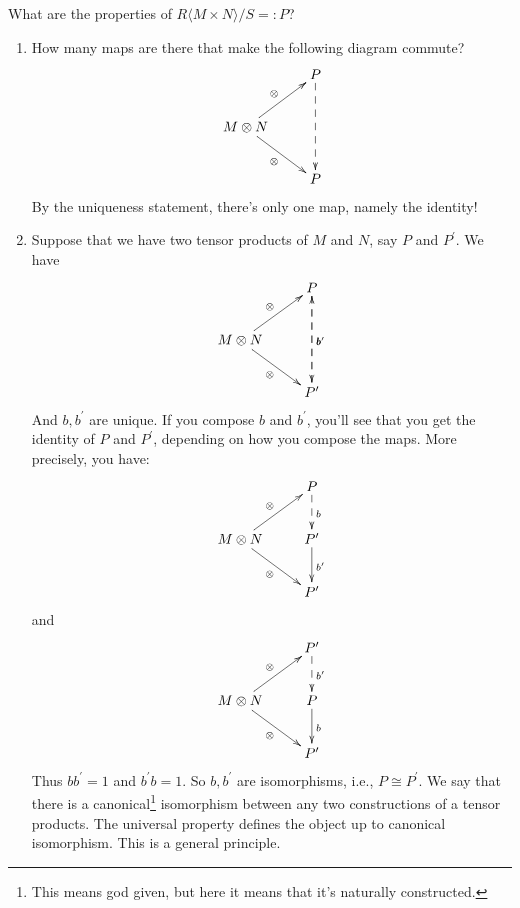 What are the properties of $R\langle M\times N\rangle/S=:P$?
\begin{enumerate}
\item How many maps are there that make the following diagram commute?
\begin{equation*}
\xymatrix{& P\ar@{-->}[dd]\\
M\otimes N\ar[ur]^\otimes\ar[dr]_\otimes & \\
& P}
\end{equation*}
By the uniqueness statement, there's only one map, namely the identity!
\item Suppose that we have two tensor products of $M$ and $N$, say $P$ and $P^\prime$. We have
\begin{equation*}
\xymatrix{& P\ar@{-->}[dd]^b\\
M\otimes N\ar[ur]^\otimes\ar[dr]_\otimes & \\
& P^\prime\ar@{-->}[uu]_{b^\prime}}
\end{equation*}
And $b,b^\prime$ are unique. If you compose $b$ and $b^\prime$, you'll see that you get the identity of $P$ and $P^\prime$, depending on how you compose the maps. More precisely, you have:
\begin{equation*}
\xymatrix{& P\ar@{-->}[d]^b\\
M\otimes N\ar[ur]^\otimes\ar[dr]_\otimes & P^\prime\ar[d]^{b^\prime}\\
& P^\prime}
\end{equation*}
and
\begin{equation*}
\xymatrix{& P^\prime\ar@{-->}[d]^{b^\prime}\\
M\otimes N\ar[ur]^\otimes\ar[dr]_\otimes & P\ar[d]^{b}\\
& P^\prime}
\end{equation*}
Thus $bb^\prime=1$ and $b^\prime b=1$. So $b,b^\prime$ are isomorphisms, i.e., $P\cong P^\prime$. We say that there is a canonical\footnote{This means god given, but here it means that it's naturally constructed.} isomorphism between any two constructions of a tensor products. The universal property defines the object up to canonical isomorphism. This is a general principle.


\end{enumerate}
